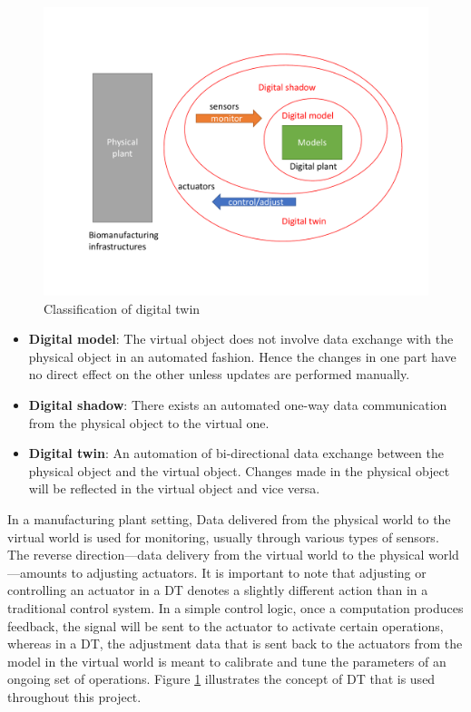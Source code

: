 \documentclass[journal,onecolumn]{IEEEtran} %
\begin{document}
\begin{figure}[hbt!]
  \centering
  \includegraphics[scale=0.5]{figures/dt.pdf}
  \caption{Classification of digital twin}
  \label{fig:dt}
\end{figure}

\begin{itemize}

  \item \textbf{Digital model}: The virtual object does not involve data exchange with the physical object in an automated fashion. Hence the changes in one part have no direct effect on the other unless updates are performed manually.

  \item \textbf{Digital shadow}: There exists an automated one-way data communication from the physical object to the virtual one.
  
  \item \textbf{Digital twin}: An automation of bi-directional data exchange between the physical object and the virtual object. Changes made in the physical object will be reflected in the virtual object and vice versa. 

\end{itemize}

In a manufacturing plant setting, Data delivered from the physical world to the virtual world is used for monitoring, usually through various types of sensors. The reverse direction---data delivery from the virtual world to the physical world---amounts to adjusting actuators. It is important to note that adjusting or controlling an actuator in a DT denotes a slightly different action than in a traditional control system. In a simple control logic, once a computation produces feedback, the signal will be sent to the actuator to activate certain operations, whereas in a DT, the adjustment data that is sent back to the actuators from the model in the virtual world is meant to calibrate and tune the parameters of an ongoing set of operations. Figure \ref{fig:dt} illustrates the concept of DT that is used throughout this project.
\end{document}
